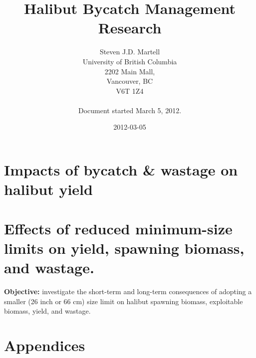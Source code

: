 \documentclass[]{report}
\title{Halibut Bycatch Management Research}
\author{ Steven J.D. Martell \\ University of British Columbia\\  2202 Main Mall, \\ Vancouver, BC\\ V6T 1Z4\\
%
\noindent\hrulefill\\
Document started March 5, 2012.
 }
\date{2012-03-05}
\begin{document}
\ifpdf
{}
\else
{}
\fi

	\maketitle \thispagestyle{empty}
\thispagestyle{empty}
\clearpage


\newpage





\newpage
\tableofcontents
{}
\newpage

\listoffigures
{}
\newpage

\listoftables
{}
\newpage



\part{Impacts of bycatch \& wastage on halibut yield}
\setcounter{chapter}{1}



\part{Effects of reduced minimum-size limits on yield, spawning biomass, and wastage.}
\setcounter{chapter}{2}

\textbf{Objective:} investigate the short-term and long-term consequences of adopting a smaller (26 inch or 66 cm) size limit on halibut spawning biomass, exploitable biomass, yield, and wastage.





\clearpage
%




\part{Appendices}
\appendix

\addtocounter{section}{0}
\renewcommand{\thetable}{A-\arabic{table}}
\setcounter{table}{0}
\setcounter{chapter}{1}

\setcounter{chapter}{2}

\end{document}
